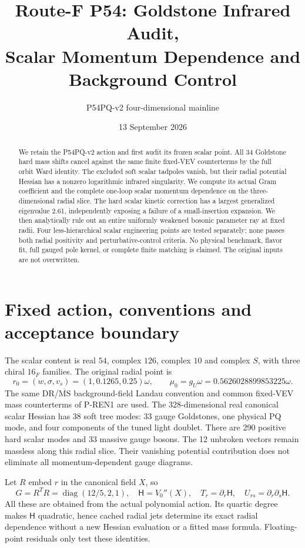\documentclass[11pt]{article}
\title{Route-F P54: Goldstone Infrared Audit,\\
Scalar Momentum Dependence and Background Control}
\author{P54PQ-v2 four-dimensional mainline}
\date{13 September 2026}
\newcommand{\diag}{\operatorname{diag}}
\newcommand{\MS}{\overline{\mathrm{MS}}}
\begin{document}
\maketitle
\begin{abstract}
We retain the P54PQ-v2 action and first audit its frozen scalar point.
All 34 Goldstone hard mass shifts cancel against the same finite
fixed-VEV counterterms by the full orbit Ward identity. The excluded
soft scalar tadpoles vanish, but their radial potential Hessian has a
nonzero logarithmic infrared singularity. We compute its actual Gram
coefficient and the complete one-loop scalar momentum dependence on
the three-dimensional radial slice. The hard scalar kinetic correction
has a largest generalized eigenvalue 2.61, independently exposing a
failure of a small-insertion expansion. We then analytically rule out
an entire uniformly weakened bosonic parameter ray at fixed radii.
Four less-hierarchical scalar engineering points are tested separately;
none passes both radial positivity and perturbative-control criteria.
No physical benchmark, flavor fit, full gauged pole kernel, or complete
finite matching is claimed. The original inputs are not overwritten.
\end{abstract}

\section{Fixed action, conventions and acceptance boundary}
The scalar content is real $54$, complex $126$, complex $10$ and complex
$S$, with three chiral $16_F$ families. The original radial point is
\begin{equation}
 r_0=(w,\sigma,v_s)=(1,0.1265,0.25)\omega,
 \qquad \mu_0=g_U\omega=0.5626028899853225\omega.
\end{equation}
The same DR/$\MS$ background-field Landau convention and common
fixed-VEV mass counterterms of P-REN1 are used. The 328-dimensional
real canonical scalar Hessian has 38 soft tree modes: 33 gauge
Goldstones, one physical PQ mode, and four components of the tuned
light doublet. There are 290 positive hard scalar modes and 33 massive
gauge bosons. The 12 unbroken vectors remain massless along this radial
slice. Their vanishing potential contribution does not eliminate all
momentum-dependent gauge diagrams.

Let $R$ embed $r$ in the canonical field $X$, so
\begin{equation}
 G=R^TR=\diag(12/5,2,1),\quad
 \mathsf H=V_0''(X),\quad T_r=\partial_r\mathsf H,\quad
 U_{rs}=\partial_r\partial_s\mathsf H.
\end{equation}
All these are obtained from the actual polynomial action. Its quartic
degree makes $\mathsf H$ quadratic, hence cached radial jets determine
its exact radial dependence without a new Hessian evaluation or a fitted
mass formula. Floating-point residuals only test these identities.
\end{document}
